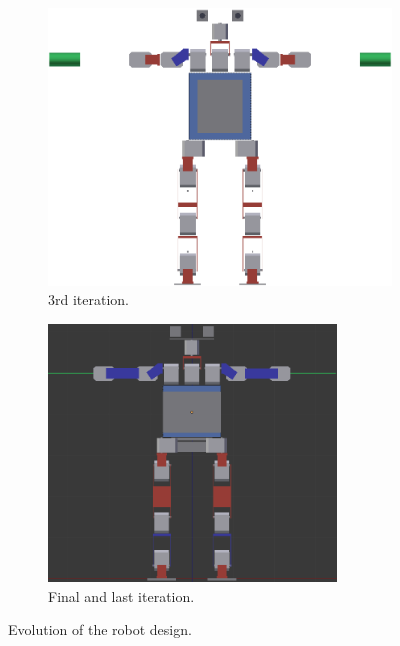 \begin{figure}[htp]
	\begin{subfigure}[b]{0.48\textwidth}
		\centering
		\includegraphics[width = \textwidth]{figures/robot_v5}
		\caption{3rd iteration. \label{fig:robot_v5}}
	\end{subfigure}
	\hfill
	\begin{subfigure}[b]{0.48\textwidth}
		\centering
		\includegraphics[width = 0.84\textwidth]{figures/robot_v7_front}
		\caption{Final and last iteration. \label{fig:robot_v7}}
	\end{subfigure}
	\caption[Evolution of the robot design]{Evolution of the robot design.}
	\label{fig:evolution}
\end{figure}

